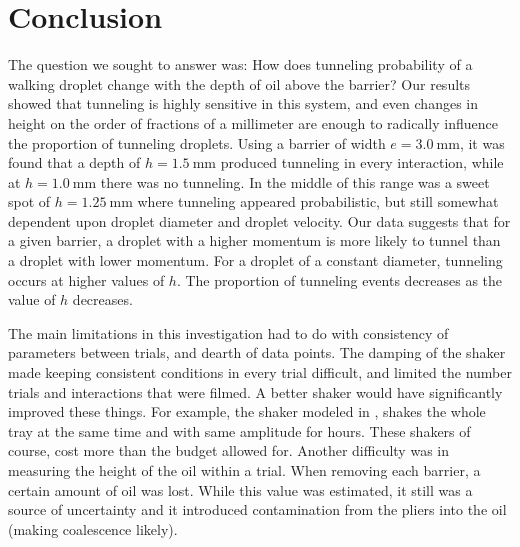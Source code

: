 \chapter*{Conclusion}
	\setcounter{chapter}{4}
	\setcounter{section}{0}
	


The question we sought to answer was: How does tunneling probability of a walking droplet change with the depth of oil above the barrier? Our results showed that tunneling is highly sensitive in this system, and even changes in height on the order of fractions of a millimeter are enough to radically influence the proportion of tunneling droplets. Using a barrier of width $e=3.0~\mathrm{mm}$, it was found that a depth of $h=1.5~\mathrm{mm}$ produced tunneling in every interaction, while at $h=1.0~\mathrm{mm}$ there was no tunneling. In the middle of this range was a sweet spot of $h=1.25~\mathrm{mm}$ where tunneling appeared probabilistic, but still somewhat dependent upon droplet diameter and droplet velocity. Our data suggests that for a given barrier, a droplet with a higher momentum is more likely to tunnel than a droplet with lower momentum. For a droplet of a constant diameter, tunneling occurs at higher values of $h$. The proportion of tunneling events decreases as the value of $h$ decreases.

The main limitations in this investigation had to do with consistency of parameters between trials, and dearth of data points. The damping of the shaker made keeping consistent conditions in every trial difficult, and limited the number trials and interactions that were filmed. A better shaker would have significantly improved these things. For example, the shaker modeled in , shakes the whole tray at the same time and with same amplitude for hours. These shakers of course, cost more than the budget allowed for. Another difficulty was in measuring the height of the oil within a trial. When removing each barrier, a certain amount of oil was lost. While this value was estimated, it still was a source of uncertainty and it introduced contamination from the pliers into the oil (making coalescence likely).

